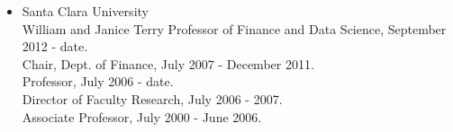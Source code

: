 \documentclass{article}
\begin{document}
\begin{description}
\begin{itemize}
\item Santa Clara University\\
\hspace*{0.25in}William and Janice Terry Professor of Finance and Data Science, September 2012 - date.\\
\hspace*{0.25in}Chair, Dept. of Finance, July 2007 - December 2011.\\
\hspace*{0.25in}Professor, July 2006 - date.\\
\hspace*{0.25in}Director of Faculty Research, July 2006 - 2007.\\
\hspace*{0.25in}Associate Professor, July 2000 - June 2006.


\end{itemize}
\end{description}
\end{document}
